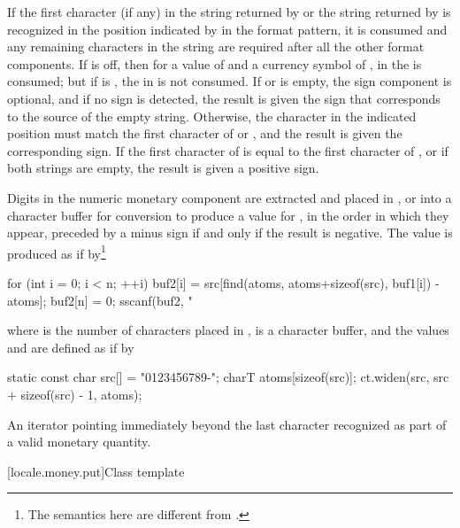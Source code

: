 \begin{itemdescr}
\pnum
If the first character (if any) in the string
returned by
or the string
returned by
is recognized in the position indicated by
in the format pattern, it is consumed and any remaining characters
in the string are required after all the other format components.
\enterexample
If
is off, then for a
value of  and a currency symbol of ,
in  the  is consumed;
but if
is , the  in  is not consumed.
\exitexample
If
or
is empty, the sign component is optional, and if no sign is
detected, the result is given the sign that corresponds to the source
of the empty string.
Otherwise, the character in the indicated position must
match the first character of
or
,
and the result is given the corresponding sign.
If the first character of
is equal to the first character of
,
or if both strings are empty, the result is given a positive sign.

\pnum
Digits in the numeric monetary component are extracted and placed in
,
or into a character buffer
for conversion to produce a value for
,
in the order in which they appear,
preceded by a minus sign if and only if the result is negative.
The value
is produced as if by\footnote{The semantics here are different from
.}

\begin{codeblock}
for (int i = 0; i < n; ++i)
  buf2[i] = src[find(atoms, atoms+sizeof(src), buf1[i]) - atoms];
buf2[n] = 0;
sscanf(buf2, "%
\end{codeblock}

where
is the number of characters placed in
,
is a character buffer, and the values
and
are defined as if by

\begin{codeblock}
static const char src[] = "0123456789-";
charT atoms[sizeof(src)];
ct.widen(src, src + sizeof(src) - 1, atoms);
\end{codeblock}

\pnum
\returns
An iterator pointing immediately beyond the last character recognized
as part of a valid monetary quantity.
\end{itemdescr}

[locale.money.put]{Class template }

